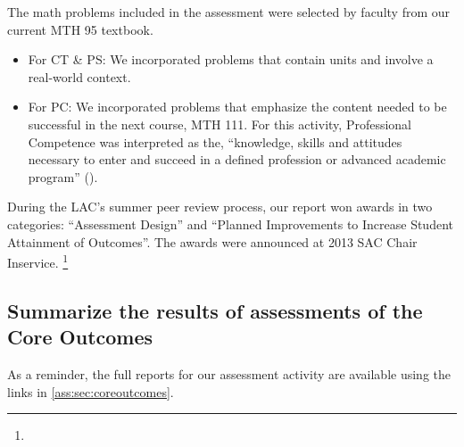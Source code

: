 \begin{description}
The math problems included in the assessment were selected by faculty from our
current MTH 95 textbook.
\begin{itemize}
\item For CT \& PS: We incorporated problems that contain units and involve a
  real-world context.
\item For PC:  We incorporated problems that emphasize the content needed to be
  successful in the next course, MTH 111.  For this activity, Professional
  Competence was interpreted as the, ``knowledge, skills and attitudes necessary
  to enter and succeed in a defined profession or advanced academic program''
  (\cite{coreoutcomes}).
\end{itemize}
During the LAC's summer peer review process, our report won awards in two
categories: ``Assessment Design'' and ``Planned Improvements to Increase Student
Attainment of Outcomes''.  The awards were announced at 2013 SAC Chair
Inservice. \footnote{\awardsurl}
\end{description}

\subsection{Summarize the results of assessments of the Core Outcomes}
As a reminder, the full reports for our assessment activity are available using
the links in \cref{ass:sec:coreoutcomes}.


